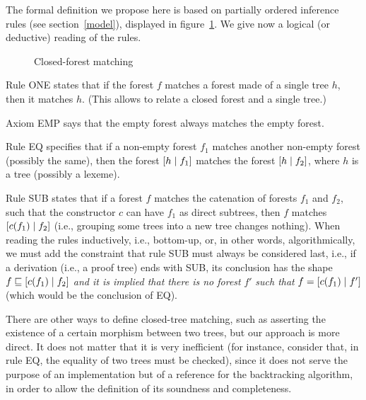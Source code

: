 The formal definition we propose here is based on partially ordered
inference rules (see section~\ref{model}), displayed in
figure~\ref{x_tree_matching_def}. We give now a logical (or deductive)
reading of the rules.

\begin{figure}[H]
\caption{Closed\hyp{}forest matching\label{x_tree_matching_def}}
\end{figure}

Rule \textsf{ONE} states that if the forest \(f\) matches a forest
made of a single tree \(h\), then it matches \(h\). (This allows to
relate a closed forest and a single tree.)

Axiom \textsf{EMP} says that the empty forest always matches the empty
forest.

Rule \textsf{EQ} specifies that if a non\hyp{}empty forest \(f_1\)
matches another non\hyp{}empty forest (possibly the same), then the
forest \([{h}\mid{f_1}]\) matches the forest \([{h}\mid{f_2}]\), where
\(h\) is a tree (possibly a lexeme).

Rule \textsf{SUB} states that if a forest \(f\) matches the catenation
of forests \(f_1\) and \(f_2\), such that the constructor \(c\) can
have \(f_1\) as direct subtrees, then \(f\) matches
\([{c(f_1)}\mid{f_2}]\) (i.e., grouping some trees into a new tree
changes nothing). When reading the rules inductively, i.e.,
bottom\hyp{}up, or, in other words, algorithmically, we must add the
constraint that rule \textsf{SUB} must always be considered last,
i.e., if a derivation (i.e., a proof tree) ends with \textsf{SUB}, its
conclusion has the shape \(f \sqsubseteq [{c(f_1)}\mid{f_2}]\)
\emph{and it is implied that there is no forest} \(f'\) \emph{such
that} \(f = [{c(f_1)}\mid{f'}]\) (which would be the conclusion of
\textsf{EQ}).
\begin{remark}
There are other ways to define closed\hyp{}tree matching, such as
asserting the existence of a certain morphism between two trees, but
our approach is more direct. It does not matter that it is very
inefficient (for instance, consider that, in rule \textsf{EQ}, the
equality of two trees must be checked), since it does not serve the
purpose of an implementation but of a reference for the backtracking
algorithm, in order to allow the definition of its soundness and
completeness.
\end{remark}

